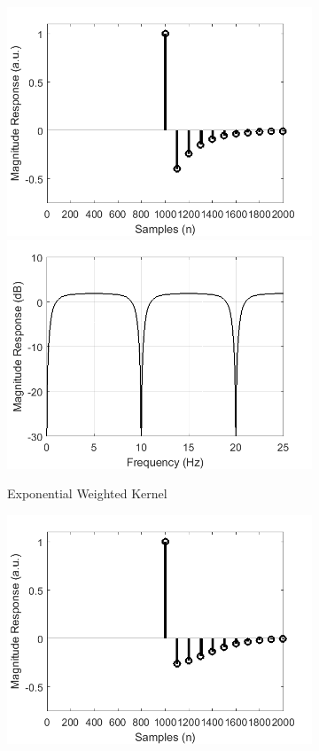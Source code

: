 \documentclass[a4paper]{article}
\begin{document}
\begin{figure}[hbtp]
\begin{subfigure}{.33\textwidth}
        \includegraphics[width=\textwidth]{img/kernel_exp.png}\\
        \includegraphics[width=\textwidth]{img/mag_exp.png}
        \caption{Exponential Weighted Kernel}\label{fig:ExponentialKernel}
    \end{subfigure}
    \begin{subfigure}{.33\textwidth}
        \includegraphics[width=\textwidth]{img/kernel_gauss.png}\\

\end{subfigure}
\end{figure}
\end{document}
